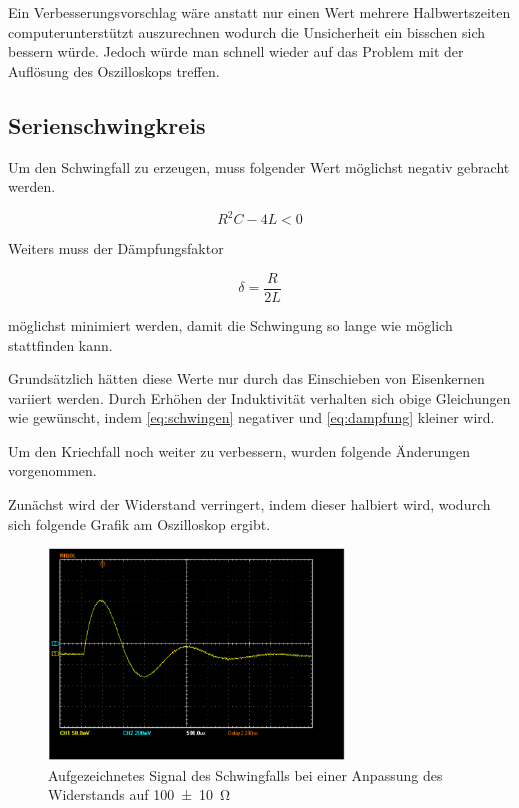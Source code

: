\documentclass[11pt,ngerman]{scrartcl}
\begin{document}
Ein Verbesserungsvorschlag wäre anstatt nur einen Wert mehrere Halbwertszeiten
computerunterstützt auszurechnen wodurch die Unsicherheit ein bisschen sich
bessern würde. Jedoch würde man schnell wieder auf das Problem mit der Auflösung
des Oszilloskops treffen.



\subsection{Serienschwingkreis}

Um den Schwingfall zu erzeugen, muss folgender Wert möglichst negativ gebracht werden.

\begin{equation}
	\label{eq:schwingen}
	R^2 C - 4L < 0
\end{equation}

Weiters muss der Dämpfungsfaktor

\begin{equation}
	\label{eq:dampfung}
	\delta = \frac{R}{2L}
\end{equation}

möglichst minimiert werden, damit die Schwingung so lange wie möglich stattfinden kann.

\vspace{2mm}

Grundsätzlich hätten diese Werte nur durch das Einschieben von Eisenkernen
variiert werden. Durch Erhöhen der Induktivität verhalten sich obige
Gleichungen wie gewünscht, indem \autoref{eq:schwingen} negativer und
\autoref{eq:dampfung} kleiner wird.

Um den Kriechfall noch weiter zu verbessern, wurden folgende Änderungen
vorgenommen.

Zunächst wird der Widerstand verringert, indem dieser halbiert wird, wodurch
sich folgende Grafik am Oszilloskop ergibt.

\begin{figure}[H]
	\begin{center}
		\includegraphics[width=0.7\textwidth]{Bild_versuch3_c_100}
	\end{center}
	\caption{Aufgezeichnetes Signal des Schwingfalls bei einer Anpassung des
		Widerstands auf \SI{100(10)}{\ohm}}
	\label{fig:schwingfall_100}
\end{figure}
\end{document}
